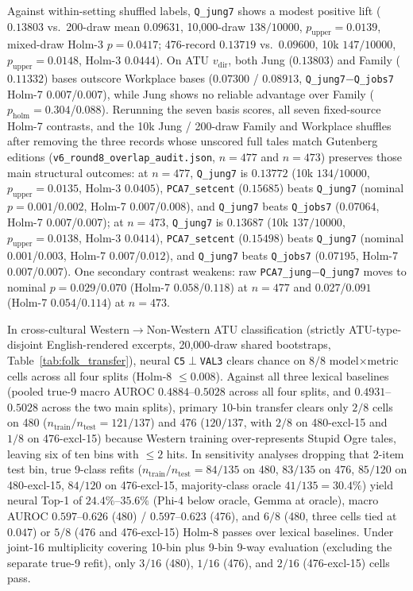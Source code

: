 \documentclass[conference]{IEEEtran}
\begin{document}
Against within-setting shuffled labels, \texttt{Q\_jung7} shows a modest positive lift ($0.13803$ vs.\ 200-draw mean $0.09631$, 10,000-draw $138/10000$, $p_{\text{upper}}=0.0139$, mixed-draw Holm-3 $p=0.0417$; 476-record $0.13719$ vs.\ $0.09600$, 10k $147/10000$, $p_{\text{upper}}=0.0148$, Holm-3 $0.0444$). On ATU $v_{\text{dir}}$, both Jung ($0.13803$) and Family ($0.11332$) bases outscore Workplace bases ($0.07300$ / $0.08913$, \texttt{Q\_jung7}$-$\texttt{Q\_jobs7} Holm-7 $0.007$/$0.007$), while Jung shows no reliable advantage over Family ($p_{\text{holm}}=0.304$/$0.088$). Rerunning the seven basis scores, all seven fixed-source Holm-7 contrasts, and the 10k Jung / 200-draw Family and Workplace shuffles after removing the three records whose unscored full tales match Gutenberg editions (\texttt{v6\_round8\_overlap\_audit.json}, $n=477$ and $n=473$) preserves those main structural outcomes: at $n=477$, \texttt{Q\_jung7} is $0.13772$ (10k $134/10000$, $p_{\text{upper}}=0.0135$, Holm-3 $0.0405$), \texttt{PCA7\_setcent} ($0.15685$) beats \texttt{Q\_jung7} (nominal $p=0.001$/$0.002$, Holm-7 $0.007$/$0.008$), and \texttt{Q\_jung7} beats \texttt{Q\_jobs7} ($0.07064$, Holm-7 $0.007$/$0.007$); at $n=473$, \texttt{Q\_jung7} is $0.13687$ (10k $137/10000$, $p_{\text{upper}}=0.0138$, Holm-3 $0.0414$), \texttt{PCA7\_setcent} ($0.15498$) beats \texttt{Q\_jung7} (nominal $0.001$/$0.003$, Holm-7 $0.007$/$0.012$), and \texttt{Q\_jung7} beats \texttt{Q\_jobs7} ($0.07195$, Holm-7 $0.007$/$0.007$). One secondary contrast weakens: raw \texttt{PCA7\_jung}$-$\texttt{Q\_jung7} moves to nominal $p=0.029$/$0.070$ (Holm-7 $0.058$/$0.118$) at $n=477$ and $0.027$/$0.091$ (Holm-7 $0.054$/$0.114$) at $n=473$.

In cross-cultural Western$\to$Non-Western ATU classification (strictly ATU-type-disjoint English-rendered excerpts, 20,000-draw shared bootstraps, Table~\ref{tab:folk_transfer}), neural \texttt{C5}$\perp$\texttt{VAL3} clears chance on $8/8$ model$\times$metric cells across all four splits (Holm-8 $\le 0.008$). Against all three lexical baselines (pooled true-9 macro AUROC $0.4884$--$0.5028$ across all four splits, and $0.4931$--$0.5028$ across the two main splits), primary 10-bin transfer clears only $2/8$ cells on 480 ($n_{\text{train}}/n_{\text{test}}=121/137$) and 476 ($120/137$, with $2/8$ on 480-excl-15 and $1/8$ on 476-excl-15) because Western training over-represents Stupid Ogre tales, leaving six of ten bins with $\le 2$ hits. In sensitivity analyses dropping that 2-item test bin, true 9-class refits ($n_{\text{train}}/n_{\text{test}}=84/135$ on 480, $83/135$ on 476, $85/120$ on 480-excl-15, $84/120$ on 476-excl-15, majority-class oracle $41/135=30.4\%$) yield neural Top-1 of $24.4\%$--$35.6\%$ (Phi-4 below oracle, Gemma at oracle), macro AUROC $0.597$--$0.626$ (480) / $0.597$--$0.623$ (476), and $6/8$ (480, three cells tied at $0.047$) or $5/8$ (476 and 476-excl-15) Holm-8 passes over lexical baselines. Under joint-16 multiplicity covering 10-bin plus 9-bin 9-way evaluation (excluding the separate true-9 refit), only $3/16$ (480), $1/16$ (476), and $2/16$ (476-excl-15) cells pass.
\end{document}

